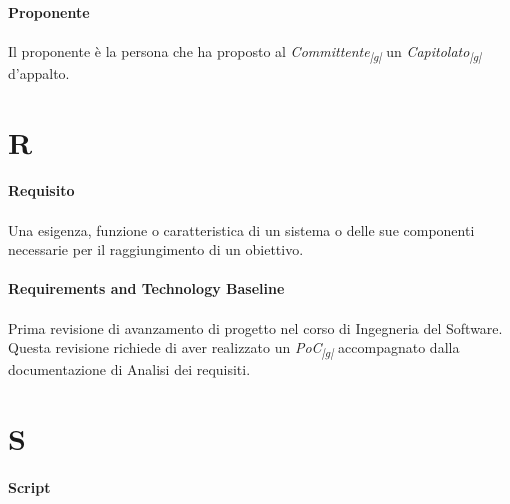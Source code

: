 \documentclass[10pt, a4paper]{article}
\newcommand{\pg}{\textsubscript{|g|}}
\begin{document}
\paragraph{Proponente}\noindent\hrulefill
\paragraph{}Il proponente è la persona che ha proposto al \textit{Committente\pg} un \textit{Capitolato\pg}
d’appalto.



\newpage
\section{R}

\vspace{2em}
\paragraph{Requisito}\noindent\hrulefill
\paragraph{}Una esigenza, funzione o caratteristica di un sistema o delle sue componenti necessarie per il raggiungimento di un obiettivo. 


\vspace{2em}
\paragraph{Requirements and Technology Baseline}\noindent\hrulefill
\paragraph{}Prima revisione di avanzamento di progetto nel corso di Ingegneria del Software. Questa revisione richiede di aver realizzato un \textit{PoC\pg} accompagnato dalla documentazione di Analisi dei requisiti.


\newpage
\section{S}
\vspace{2em}
\paragraph{Script}\noindent\hrulefill
\end{document}
